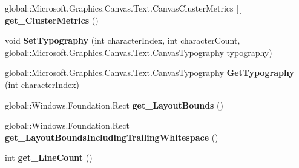 \begin{DoxyCompactItemize}
\item 
\mbox{\label{interface_microsoft_1_1_graphics_1_1_canvas_1_1_text_1_1_i_canvas_text_layout_a5be8b44c03e366473263dacc72514c1f}} 
global\+::\+Microsoft.\+Graphics.\+Canvas.\+Text.\+Canvas\+Cluster\+Metrics \mbox{[}$\,$\mbox{]} {\bfseries get\+\_\+\+Cluster\+Metrics} ()
\item 
\mbox{\label{interface_microsoft_1_1_graphics_1_1_canvas_1_1_text_1_1_i_canvas_text_layout_a882229f7daee747656cede530df97f13}} 
void {\bfseries Set\+Typography} (int character\+Index, int character\+Count, global\+::\+Microsoft.\+Graphics.\+Canvas.\+Text.\+Canvas\+Typography typography)
\item 
\mbox{\label{interface_microsoft_1_1_graphics_1_1_canvas_1_1_text_1_1_i_canvas_text_layout_a75787883a628465c1be818d21a9828f6}} 
global\+::\+Microsoft.\+Graphics.\+Canvas.\+Text.\+Canvas\+Typography {\bfseries Get\+Typography} (int character\+Index)
\item 
\mbox{\label{interface_microsoft_1_1_graphics_1_1_canvas_1_1_text_1_1_i_canvas_text_layout_af55ce4a21c46a7f5089b4dbbbd66f336}} 
global\+::\+Windows.\+Foundation.\+Rect {\bfseries get\+\_\+\+Layout\+Bounds} ()
\item 
\mbox{\label{interface_microsoft_1_1_graphics_1_1_canvas_1_1_text_1_1_i_canvas_text_layout_a890cd156f823cdf4a32285b115407daf}} 
global\+::\+Windows.\+Foundation.\+Rect {\bfseries get\+\_\+\+Layout\+Bounds\+Including\+Trailing\+Whitespace} ()
\item 
\mbox{\label{interface_microsoft_1_1_graphics_1_1_canvas_1_1_text_1_1_i_canvas_text_layout_abdd79458426259c3a675c4bce6023422}} 
int {\bfseries get\+\_\+\+Line\+Count} ()
\item 
\mbox{\label{interface_microsoft_1_1_graphics_1_1_canvas_1_1_text_1_1_i_canvas_text_layout_a6a8cb40ddc63b383f347253a749d9f8f}} 

\end{DoxyCompactItemize}
